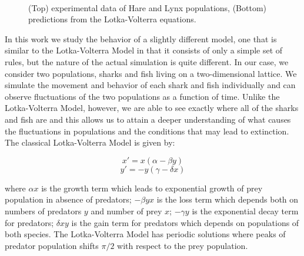 \documentclass[aps,prl,preprint,superscriptaddress]{revtex4}
\begin{document}
\begin{figure}[H]
	\centering
	\\
	\caption{(Top) experimental data of Hare and Lynx populations, (Bottom) predictions from the Lotka-Volterra equations. }
	\label{LV} 
\end{figure}

In this work we study the behavior of a slightly different model, one that  is similar to the Lotka-Volterra Model in that it consists of only a simple set of rules, but the nature of the actual simulation is quite different. In our case, we consider two populations, sharks and fish living on a two-dimensional lattice. We simulate the movement and behavior of each shark and fish individually and can observe fluctuations of the two populations as a function of time. Unlike the Lotka-Volterra Model, however, we are able to see exactly where all of the sharks and fish are and this allows us to attain a deeper understanding of what causes the fluctuations in populations and the conditions that may lead to extinction. The classical Lotka-Volterra Model is given by:


\begin{equation}
x' = x(\alpha-\beta y)
\end{equation}
\begin{equation}
y' = -y(\gamma -\delta x)
\end{equation}

where $\alpha x$ is the growth term which leads to exponential growth of prey population in absence of predators; $-\beta yx$ is the loss term which depends both on numbers of predators $y$ and number of prey $x$; $-\gamma y$ is the exponential decay term for predators; $\delta xy$ is the gain term for predators which depends on populations of both species. The Lotka-Volterra Model has periodic solutions where peaks of predator population shifts $\pi/2$ with respect to the prey population.
\end{document}
